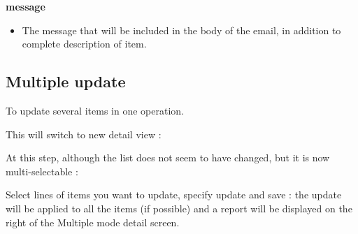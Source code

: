 \documentclass[letterpaper,10pt,english]{sphinxmanual}
\begin{document}
\textbf{message}
\begin{itemize}
\item {} 
The message that will be included in the body of the email, in addition to complete description of item.

\end{itemize}
\newpage

\subsection{Multiple update}
\label{Gui:multiple-update}\label{Gui:gui-multiple-update-label}
To update several items in one operation.

This will switch to new detail view :
\begin{figure}[htbp]
\centering

\end{figure}

At this step, although the list does not seem to have changed, but it is now multi-selectable :
\begin{figure}[htbp]
\centering

\end{figure}

Select lines of items you want to update, specify update and save : the update will be applied to all the items (if possible) and a report will be displayed on the right of the Multiple mode detail screen.
\begin{figure}[htbp]
\centering

\end{figure}
\newpage
\end{document}
